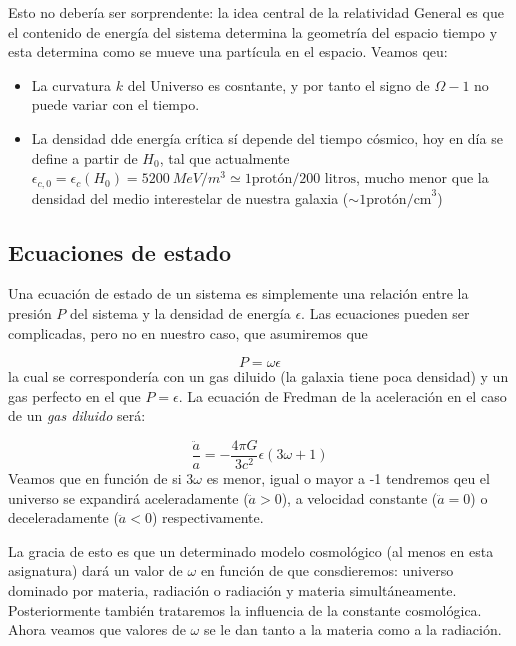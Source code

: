 Esto no debería ser sorprendente: la idea central de la relatividad General es que el contenido de energía del sistema determina la geometría del espacio tiempo y esta determina como se mueve una partícula en el espacio. Veamos qeu:

\begin{itemize}
	\item La curvatura $k$ del Universo es cosntante, y por tanto el signo de $\Omega-1$ no puede variar con el tiempo.
	\item La densidad dde energía crítica sí depende del tiempo cósmico, hoy en día se define a partir de $H_0$, tal que actualmente $\epsilon_{c,0} = \epsilon_c (H_0) = \SI{5200}{MeV/m^3} \simeq 1 \text{protón/200 litros}$, mucho menor que la densidad del medio interestelar de nuestra galaxia ($ \sim 1 \text{protón/cm}^3$)
\end{itemize}

\subsection{Ecuaciones de estado}

Una ecuación de estado de un sistema es simplemente una relación entre la presión $P$ del sistema y la densidad de energía $\epsilon$. Las ecuaciones pueden ser complicadas, pero no en nuestro caso, que asumiremos que

\begin{equation}
	P = \omega \epsilon
\end{equation}
la cual se correspondería con un gas diluido (la galaxia tiene poca densidad) y un gas perfecto en el que $P=\epsilon$. La ecuación de Fredman de la aceleración en el caso de un \textit{gas diluido} será:


\begin{equation}
	\frac{\ddot{a}}{a} = - \frac{4\pi G}{3c^2} \epsilon (3 \omega +1)
\end{equation}
Veamos que en función de si $3\omega$ es menor, igual o mayor a -1 tendremos qeu el universo se expandirá aceleradamente ($\ddot{a}>0$), a velocidad constante  ($\ddot{a}=0$) o deceleradamente ($\ddot{a}<0$) respectivamente.

La gracia de esto es que un determinado modelo cosmológico (al menos en esta asignatura) dará un valor de $\omega$ en función de que consdieremos: universo dominado por materia, radiación o radiación y materia simultáneamente.  Posteriormente también trataremos la influencia de la constante cosmológica. Ahora veamos que valores de $\omega$ se le dan tanto a la materia como a la radiación.



